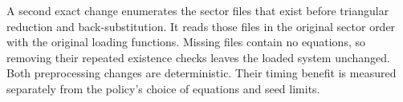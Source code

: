 A second exact change enumerates the sector files that exist before triangular reduction and back-substitution. It reads those files in the original sector order with the original loading functions. Missing files contain no equations, so removing their repeated existence checks leaves the loaded system unchanged. Both preprocessing changes are deterministic. Their timing benefit is measured separately from the policy's choice of equations and seed limits.
